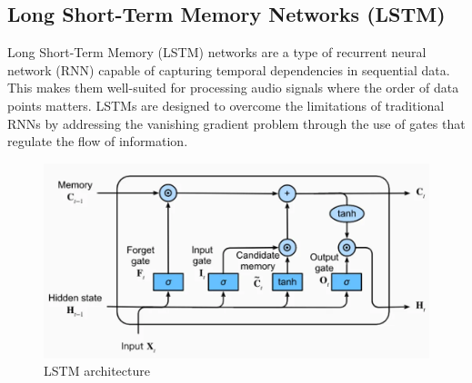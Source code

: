 \subsection{Long Short-Term Memory Networks (LSTM)}

Long Short-Term Memory (LSTM) networks are a type of recurrent neural network
(RNN) capable of capturing temporal dependencies in sequential data. This makes
them well-suited for processing audio signals where the order of data points
matters. LSTMs are designed to overcome the limitations of traditional RNNs by
addressing the vanishing gradient problem through the use of gates that
regulate the flow of information.

\begin{figure}[h!]
    \centering
    \includegraphics[scale=0.4]{images/LSTM.png}
    \caption{LSTM architecture}%
\end{figure}

